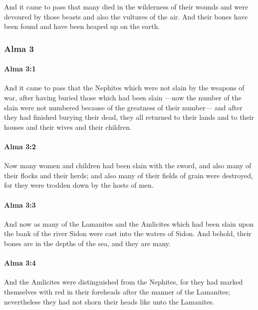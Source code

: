 			And it came to pass that many died in the wilderness of their wounds
			and were devoured by those beasts and also the vultures of the air.
			And their bones have been found and have been heaped up on the earth.

	\subsubsection{Alma 3} %
		\label{ALMA-3}
		
		\paragraph{Alma 3:1} %
			\label{ALMA-3-1}

			And it came to pass that
			the Nephites which were not slain by the weapons of war,
			after having buried those which had been slain
			---now the number of the slain were not numbered
			because of the greatness of their number---
			and after they had finished burying their dead,
			they all returned to their lands
			and to their houses and their wives and their children.

		\paragraph{Alma 3:2} %
			\label{ALMA-3-2}

			Now many women and children had been slain with the sword,
			and also many of their flocks and their herds;
			and also many of their fields of grain were destroyed,
			for they were trodden down by the hosts of men.

		\paragraph{Alma 3:3} %
			\label{ALMA-3-3}

			And now as many of the Lamanites and the Amlicites
			which had been slain upon the bank of the river Sidon
			were cast into the waters of Sidon.
			And behold, their bones are in the depths of the sea,
			and they are many.

		\paragraph{Alma 3:4} %
			\label{ALMA-3-4}

			And the Amlicites were distinguished from the Nephites,
			for they had marked themselves with red in their foreheads
			after the manner of the Lamanites;
			nevertheless they had not shorn their heads like unto the Lamanites.

